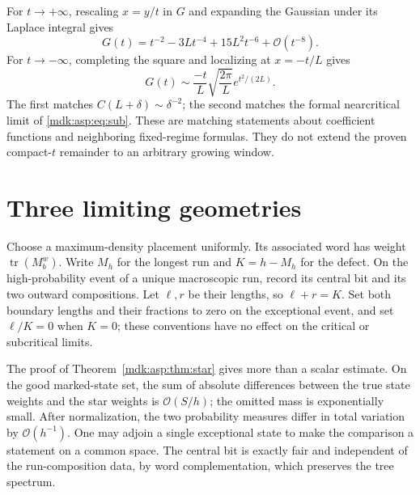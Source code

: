\documentclass[11pt,letterpaper]{article}
\numberwithin{equation}{section}
\theoremstyle{remark}\newtheorem{remark}[theorem]{Remark}
\newcommand{\Oh}{\mathcal O}\newcommand{\Q}{\mathbb Q}\newcommand{\N}{\mathbb N}\newcommand{\R}{\mathbb R}
\DeclareMathOperator{\tr}{tr}\DeclareMathOperator{\TV}{TV}
\begin{document}
For $t\to+\infty$, rescaling $x=y/t$ in $G$ and expanding the Gaussian under its Laplace integral gives
\[
G(t)=t^{-2}-3Lt^{-4}+15L^2t^{-6}+\Oh(t^{-8}).
\]
For $t\to-\infty$, completing the square and localizing at $x=-t/L$ gives
\[
G(t)\sim\frac{-t}{L}\sqrt{\frac{2\pi}{L}}e^{t^2/(2L)}.
\]
The first matches $C(L+\delta)\sim\delta^{-2}$; the second matches the formal nearcritical limit of \eqref{mdk:asp:eq:sub}. These are matching statements about coefficient functions and neighboring fixed-regime formulas. They do not extend the proven compact-$t$ remainder to an arbitrary growing window.

\section{Three limiting geometries}\label{mdk:asp:sec:laws}
Choose a maximum-density placement uniformly. Its associated word has weight $\tr(M_b^w)$. Write $M_h$ for the longest run and $K=h-M_h$ for the defect. On the high-probability event of a unique macroscopic run, record its central bit and its two outward compositions. Let $\ell,r$ be their lengths, so $\ell+r=K$. Set both boundary lengths and their fractions to zero on the exceptional event, and set $\ell/K=0$ when $K=0$; these conventions have no effect on the critical or subcritical limits.

The proof of Theorem~\ref{mdk:asp:thm:star} gives more than a scalar estimate. On the good marked-state set, the sum of absolute differences between the true state weights and the star weights is $\Oh(S/h)$; the omitted mass is exponentially small. After normalization, the two probability measures differ in total variation by $\Oh(h^{-1})$. One may adjoin a single exceptional state to make the comparison a statement on a common space. The central bit is exactly fair and independent of the run-composition data, by word complementation, which preserves the tree spectrum.
\end{document}
